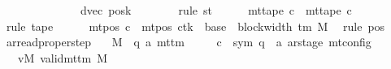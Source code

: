 \begin{isabellebody}
\ \ \ \ \ \ \ \ \ \ \ \ \ \ dvec{\isacharcomma}{\kern0pt}\ {\isacharquery}{\kern0pt}posk{\isacharprime}{\kern0pt}{\isacharparenright}{\kern0pt}{\isachardoublequoteclose}\isanewline
\ \ \ \ \ \ \isamarkupfalse%
\ {\isacharparenleft}{\kern0pt}rule\ st{}{\isacharprime}{\kern0pt}{\isacharparenright}{\kern0pt}\isanewline
\ \ \ \ \isamarkupfalse%
\ {\isachardoublequoteopen}mt{\isacharunderscore}{\kern0pt}tape\ c{}\ {\isacharequal}{\kern0pt}\ mt{\isacharunderscore}{\kern0pt}tape\ c{\isacharprime}{\kern0pt}{\isachardoublequoteclose}\ \isamarkupfalse%
\ {\isacharparenleft}{\kern0pt}rule\ tape{}{\isacharparenright}{\kern0pt}\isanewline
\ \ \ \ \isamarkupfalse%
\ {\isachardoublequoteopen}mt{\isacharunderscore}{\kern0pt}pos\ c{}\ {\isacharequal}{\kern0pt}\ {\isacharparenleft}{\kern0pt}mt{\isacharunderscore}{\kern0pt}pos\ c{\isacharprime}{\kern0pt}{\isacharparenright}{\kern0pt}{\isacharparenleft}{\kern0pt}tk\ {\isacharcolon}{\kern0pt}{\isacharequal}{\kern0pt}\ base\ {\isacharplus}{\kern0pt}\ block{\isacharunderscore}{\kern0pt}width\ {\isacharparenleft}{\kern0pt}{\isasymGamma}{\isacharunderscore}{\kern0pt}tm\ M{\isacharparenright}{\kern0pt}{\isacharparenright}{\kern0pt}{\isachardoublequoteclose}\ \isamarkupfalse%
\ {\isacharparenleft}{\kern0pt}rule\ pos{}{\isacharparenright}{\kern0pt}\isanewline
\ \ \isamarkupfalse%
\isanewline
{}\isamarkupfalse%
%
\endisatagproof
{\isafoldproof}%
%
\isadelimproof
\isanewline
%
\endisadelimproof
\isanewline
{}\isamarkupfalse%
\ ar{\isacharunderscore}{\kern0pt}read{\isacharunderscore}{\kern0pt}proper{\isacharunderscore}{\kern0pt}step{\isacharcolon}{\kern0pt}\isanewline
\ \ \ M\ {\isacharcolon}{\kern0pt}{\isacharcolon}{\kern0pt}\ {\isachardoublequoteopen}{\isacharparenleft}{\kern0pt}{\isacharprime}{\kern0pt}q{\isacharcomma}{\kern0pt}\ {\isacharprime}{\kern0pt}a{\isacharparenright}{\kern0pt}\ mttm{\isachardoublequoteclose}\isanewline
\ \ \ \ \ c{\isacharprime}{\kern0pt}\ {\isacharcolon}{\kern0pt}{\isacharcolon}{\kern0pt}\ {\isachardoublequoteopen}{\isacharparenleft}{\kern0pt}sym{}{\isacharcomma}{\kern0pt}\ {\isacharprime}{\kern0pt}q\ {\isasymtimes}\ {\isacharprime}{\kern0pt}a\ ar{\isacharunderscore}{\kern0pt}stage{\isacharparenright}{\kern0pt}\ mt{\isacharunderscore}{\kern0pt}config{\isachardoublequoteclose}\isanewline
\ \ \ vM{\isacharcolon}{\kern0pt}\ {\isachardoublequoteopen}valid{\isacharunderscore}{\kern0pt}mttm\ M{\isachardoublequoteclose}\isanewline

\end{isabellebody}
